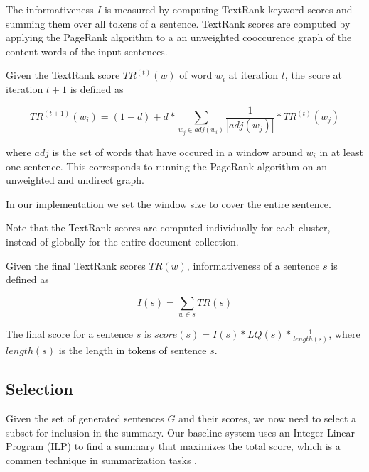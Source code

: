 \documentclass[a4paper,BCOR=10mm]{report}
\numberwithin{lemma}{chapter}
\numberwithin{definition}{chapter}
\begin{document}
The informativeness $I$ is measured by computing TextRank \citep{textrank} keyword scores and summing them over all tokens of a sentence.
TextRank scores are computed by applying the PageRank \citep{pagerank} algorithm to a an unweighted cooccurence graph of the content words of the input sentences.

Given the TextRank score $TR^{(t)}(w)$ of word $w_i$ at iteration $t$, the score at iteration $t + 1$ is defined as

\begin{equation}
TR^{(t + 1)}(w_i) = (1 - d) + d * \sum_{w_j \in \mathit{adj}(w_i)} \frac{1}{|\mathit{adj}(w_j)|} * TR^{(t)}(w_j)
\end{equation}

where $\mathit{adj}$ is the set of words that have occured in a window around $w_i$ in at least one sentence.
This corresponds to running the PageRank algorithm on an unweighted and undirect graph.

In our implementation we set the window size to cover the entire sentence.

Note that the TextRank scores are computed individually for each cluster, instead of globally for the entire document collection.

Given the final TextRank scores $TR(w)$, informativeness of a sentence $s$ is defined as

\begin{equation}
    I(s) = \sum_{w \in s} TR(s)
\end{equation}

The final score for a sentence $s$ is $\mathit{score}(s) = I(s) * LQ(s) * \frac{1}{\mathit{length}(s)}$, where $\mathit{length}(s)$ is the length in tokens of sentence $s$. %


\subsection{Selection} \label{sec:baseline-selection}

Given the set of generated sentences $G$ and their scores, we now need to select a subset for inclusion in the summary.
Our baseline system uses an Integer Linear Program (ILP) to find a summary that maximizes the total score, which is a commen technique in summarization tasks \citep{recent-advances}. %
\end{document}
